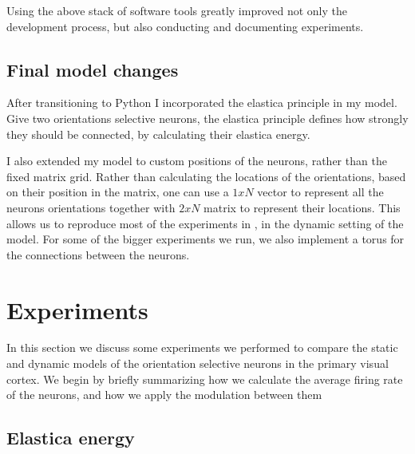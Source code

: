 Using the above stack of software tools greatly improved not only the development process, but also conducting and documenting experiments.

\section{Final model changes}
After transitioning to Python I incorporated the elastica principle in my model. Give two orientations selective neurons, the elastica principle defines how strongly they should be connected, by calculating their elastica energy.

I also extended my model to custom positions of the neurons, rather than the fixed matrix grid. Rather than calculating the locations of the orientations, based on their position in the matrix, one can use a $1xN$ vector to represent all the neurons orientations together with $2xN$ matrix to represent their locations. This allows us to reproduce most of the experiments in \cite{keemink2015unified}, in the dynamic setting of the model. For some of the bigger experiments we run, we also implement a torus for the connections between the neurons.


\chapter{Experiments}

In this section we discuss some experiments we performed to compare the static and dynamic models of the orientation selective neurons in the primary visual cortex. We begin by briefly summarizing how we calculate the average firing rate of the neurons, and how we apply the modulation between them






\section{Elastica energy}

